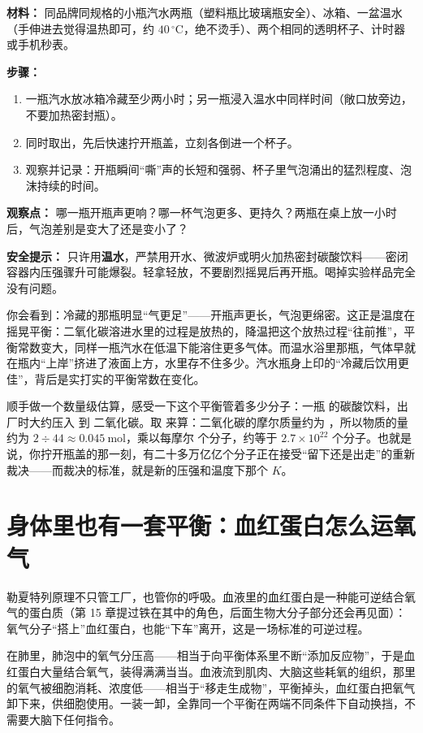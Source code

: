 \begin{shiyan}
\textbf{材料：} 同品牌同规格的小瓶汽水两瓶（塑料瓶比玻璃瓶安全）、冰箱、一盆温水（手伸进去觉得温热即可，约 $40\,^{\circ}\mathrm{C}$，绝不烫手）、两个相同的透明杯子、计时器或手机秒表。

\textbf{步骤：}
\begin{enumerate}[itemsep=1pt]
\item 一瓶汽水放冰箱冷藏至少两小时；另一瓶浸入温水中同样时间（敞口放旁边，不要加热密封瓶）。
\item 同时取出，先后快速拧开瓶盖，立刻各倒进一个杯子。
\item 观察并记录：开瓶瞬间“嘶”声的长短和强弱、杯子里气泡涌出的猛烈程度、泡沫持续的时间。
\end{enumerate}

\textbf{观察点：} 哪一瓶开瓶声更响？哪一杯气泡更多、更持久？两瓶在桌上放一小时后，气泡差别是变大了还是变小了？

\textbf{安全提示：} 只许用\textbf{温水}，严禁用开水、微波炉或明火加热密封碳酸饮料——密闭容器内压强骤升可能爆裂。轻拿轻放，不要剧烈摇晃后再开瓶。喝掉实验样品完全没有问题。
\end{shiyan}

你会看到：冷藏的那瓶明显“气更足”——开瓶声更长，气泡更绵密。这正是温度在摇晃平衡：二氧化碳溶进水里的过程是放热的，降温把这个放热过程“往前推”，平衡常数变大，同样一瓶汽水在低温下能溶住更多气体。而温水浴里那瓶，气体早就在瓶内“上岸”挤进了液面上方，水里存不住多少。汽水瓶身上印的“冷藏后饮用更佳”，背后是实打实的平衡常数在变化。

顺手做一个数量级估算，感受一下这个平衡管着多少分子：一瓶  的碳酸饮料，出厂时大约压入  到  二氧化碳。取  来算：二氧化碳的摩尔质量约为 ，所以物质的量约为 $2\div 44\approx 0.045\ \mathrm{mol}$，乘以每摩尔  个分子，约等于 $2.7\times 10^{22}$ 个分子。也就是说，你拧开瓶盖的那一刻，有二十多万亿亿个分子正在接受“留下还是出走”的重新裁决——而裁决的标准，就是新的压强和温度下那个 $K$。

\section{身体里也有一套平衡：血红蛋白怎么运氧气}

勒夏特列原理不只管工厂，也管你的呼吸。血液里的血红蛋白是一种能可逆结合氧气的蛋白质（第 15 章提过铁在其中的角色，后面生物大分子部分还会再见面）：氧气分子“搭上”血红蛋白，也能“下车”离开，这是一场标准的可逆过程。

在肺里，肺泡中的氧气分压高——相当于向平衡体系里不断“添加反应物”，于是血红蛋白大量结合氧气，装得满满当当。血液流到肌肉、大脑这些耗氧的组织，那里的氧气被细胞消耗、浓度低——相当于“移走生成物”，平衡掉头，血红蛋白把氧气卸下来，供细胞使用。一装一卸，全靠同一个平衡在两端不同条件下自动换挡，不需要大脑下任何指令。

